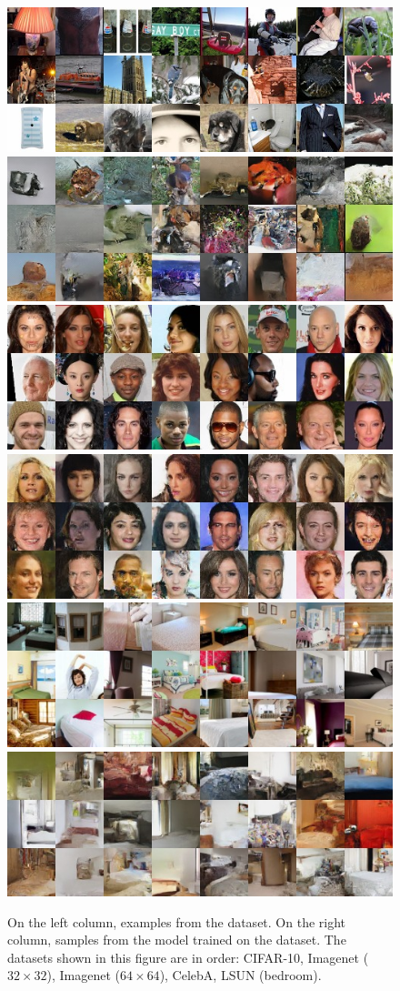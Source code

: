 \documentclass{article}
\begin{document}
\begin{figure}
\begin{center}
    \includegraphics[width=.47\textwidth]{fig_imnet_64_examples.jpg} \hfill
    \includegraphics[width=.47\textwidth]{fig_imnet_64_samples.jpg} \\\vspace{1mm}
    \includegraphics[width=.47\textwidth]{fig_celeba_examples.jpg} \hfill
    \includegraphics[width=.47\textwidth]{fig_celeba_samples.jpg} \\\vspace{1mm}
    \includegraphics[width=.47\textwidth]{fig_bedroom_examples.jpg} \hfill
    \includegraphics[width=.47\textwidth]{fig_bedroom_samples.jpg} %
    \caption{On the left column, examples from the dataset. On the right column, samples from the model trained on the dataset. The datasets shown in this figure are in order: CIFAR-10, Imagenet ($32 \times 32$), Imagenet ($64 \times 64$), CelebA, LSUN (bedroom).%
    }
    \label{fig:samples}
\end{center}
\end{figure}
\end{document}

